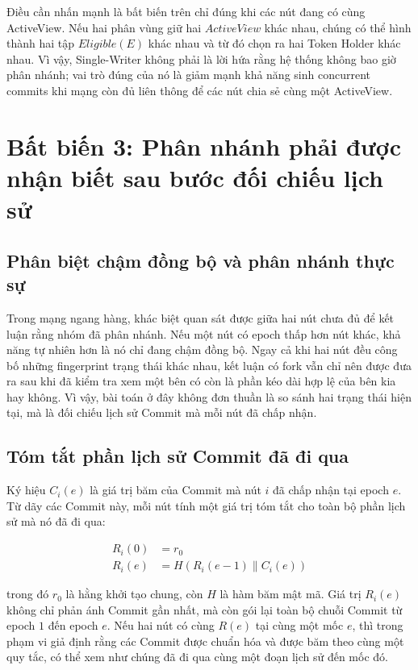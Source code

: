 \documentclass[../DoAn.tex]{subfiles}
\begin{document}
Điều cần nhấn mạnh là bất biến trên chỉ đúng khi các nút đang có cùng ActiveView. Nếu hai phân vùng giữ hai $ActiveView$ khác nhau, chúng có thể hình thành hai tập $Eligible(E)$ khác nhau và từ đó chọn ra hai Token Holder khác nhau. Vì vậy, Single-Writer không phải là lời hứa rằng hệ thống không bao giờ phân nhánh; vai trò đúng của nó là giảm mạnh khả năng sinh concurrent commits khi mạng còn đủ liên thông để các nút chia sẻ cùng một ActiveView.

\section{Bất biến 3: Phân nhánh phải được nhận biết sau bước đối chiếu lịch sử}
\label{sec:bat_bien_fork_detection}

\subsection{Phân biệt chậm đồng bộ và phân nhánh thực sự}

Trong mạng ngang hàng, khác biệt quan sát được giữa hai nút chưa đủ để kết luận rằng nhóm đã phân nhánh. Nếu một nút có epoch thấp hơn nút khác, khả năng tự nhiên hơn là nó chỉ đang chậm đồng bộ. Ngay cả khi hai nút đều công bố những fingerprint trạng thái khác nhau, kết luận có fork vẫn chỉ nên được đưa ra sau khi đã kiểm tra xem một bên có còn là phần kéo dài hợp lệ của bên kia hay không. Vì vậy, bài toán ở đây không đơn thuần là so sánh hai trạng thái hiện tại, mà là đối chiếu lịch sử Commit mà mỗi nút đã chấp nhận.

\subsection{Tóm tắt phần lịch sử Commit đã đi qua}

Ký hiệu $C_i(e)$ là giá trị băm của Commit mà nút $i$ đã chấp nhận tại epoch $e$. Từ dãy các Commit này, mỗi nút tính một giá trị tóm tắt cho toàn bộ phần lịch sử mà nó đã đi qua:

\begin{align*}
R_i(0) &= r_0 \\
R_i(e) &= H(R_i(e - 1) \parallel C_i(e))
\end{align*}

trong đó $r_0$ là hằng khởi tạo chung, còn $H$ là hàm băm mật mã. Giá trị $R_i(e)$ không chỉ phản ánh Commit gần nhất, mà còn gói lại toàn bộ chuỗi Commit từ epoch $1$ đến epoch $e$. Nếu hai nút có cùng $R(e)$ tại cùng một mốc $e$, thì trong phạm vi giả định rằng các Commit được chuẩn hóa và được băm theo cùng một quy tắc, có thể xem như chúng đã đi qua cùng một đoạn lịch sử đến mốc đó.
\end{document}
